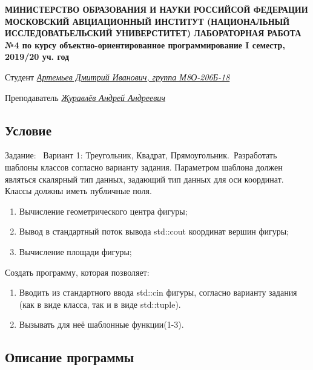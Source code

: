 \documentclass[12pt]{article}
\begin{document}
\begin{titlepage}
\begin{center}
\textbf{МИНИСТЕРСТВО ОБРАЗОВАНИЯ И НАУКИ РОССИЙСОЙ ФЕДЕРАЦИИ
\medskip
МОСКОВСКИЙ АВЦИАЦИОННЫЙ ИНСТИТУТ
(НАЦИОНАЛЬНЫЙ ИССЛЕДОВАТЬЕЛЬСКИЙ УНИВЕРСТИТЕТ)
\vfill\vfill
{\Huge ЛАБОРАТОРНАЯ РАБОТА №4} 
по курсу объектно-ориентированное программирование
I семестр, 2019/20 уч. год}
\end{center}
\vfill

Студент \uline{\it {Артемьев Дмитрий Иванович, группа М8О-206Б-18}\hfill}

Преподаватель \uline{\it {Журавлёв Андрей Андреевич}\hfill}

\vfill
\end{titlepage}

\subsection*{Условие}

Задание: \
Вариант 1: Треугольник, Квадрат, Прямоугольник.\
Разработать шаблоны классов согласно варианту задания. Параметром шаблона должен являться скалярный тип данных, задающий тип данных для оси координат. Классы должны иметь публичные поля. 
\begin{enumerate}
\item Вычисление геометрического центра фигуры;
\item Вывод в стандартный поток вывода std::cout координат вершин фигуры;
\item Вычисление площади фигуры;
\end{enumerate}

Создать программу, которая позволяет:
\begin{enumerate}
\item Вводить из стандартного ввода std::cin фигуры, согласно варианту задания (как в виде класса, так и в виде std::tuple).
\item Вызывать для неё шаблонные функции(1-3).
\end{enumerate}

\subsection*{Описание программы}
\end{document}
